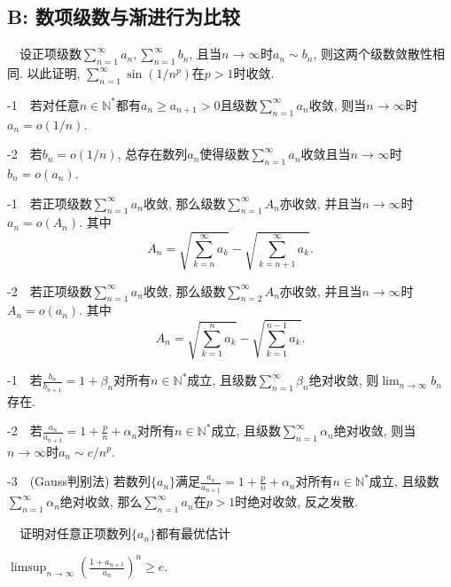 \subsection*{B: 数项级数与渐进行为比较}

~~设正项级数$\sum_{n=1}^{\infty} a_n, \sum_{n=1}^{\infty} b_n$, 且当$n\to \infty$时$a_n \sim b_n$, 则这两个级数敛散性相同. 以此证明, $\sum_{n=1}^{\infty} \sin (1/n^p)$在$p>1$时收敛. 
\vspace{1em}

-1~~若对任意$n \in \mathbb{N}^*$都有$a_n \geq a_{n+1}>0$且级数$\sum_{n=1}^{\infty} a_n$收敛, 则当$n\to \infty$时$a_n=o(1/n)$. 
\vspace{1em}

-2~~若$b_n=o(1/n)$, 总存在数列$a_n$使得级数$\sum_{n=1}^{\infty} a_n$收敛且当$n\to \infty$时$b_n=o(a_n)$. 
\vspace{1em}

-1~~若正项级数$\sum_{n=1}^{\infty} a_n$收敛, 那么级数$\sum_{n=1}^{\infty} A_n$亦收敛, 并且当$n\to \infty$时$a_n=o(A_n)$. 其中$$A_n=\sqrt{\sum_{k=n}^{\infty} a_k} - \sqrt{\sum_{k=n+1}^{\infty} a_k}.$$

-2~~若正项级数$\sum_{n=1}^{\infty} a_n$收敛, 那么级数$\sum_{n=2}^{\infty} A_n$亦收敛, 并且当$n\to \infty$时$A_n=o(a_n)$. 其中$$A_n=\sqrt{\sum_{k=1}^{n} a_k} - \sqrt{\sum_{k=1}^{n-1} a_k}.$$

-1~~若$\frac{b_n}{b_{n+1}}=1+\beta _n$对所有$n \in \mathbb{N}^*$成立, 且级数$\sum_{n=1}^{\infty} \beta _n$绝对收敛, 则$\lim_{n\to \infty} b_n$存在. 
\vspace{1em}

-2~~若$\frac{a_n}{a_{n+1}}=1+\frac{p}{n} +\alpha _n$对所有$n \in \mathbb{N}^*$成立, 且级数$\sum_{n=1}^{\infty} \alpha _n$绝对收敛, 则当$n\to \infty$时$a_n \sim c/n^p$. 
\vspace{1em}

-3~~(Gauss判别法) 若数列$\{ a_n \}$满足$\frac{a_n}{a_{n+1}}=1+\frac{p}{n} +\alpha _n$对所有$n \in \mathbb{N}^*$成立, 且级数$\sum_{n=1}^{\infty} \alpha _n$绝对收敛, 那么$\sum_{n=1}^{\infty} a_n$在$p>1$时绝对收敛, 反之发散. 
\vspace{1em}

~~证明对任意正项数列$\{ a_n \}$都有{\color{blue}最优}估计
\begin{center}
	$\displaystyle \limsup_{n\to \infty} \left(\frac{1+a_{n+1}}{a_n} \right)^n \geq e.$
\end{center}


